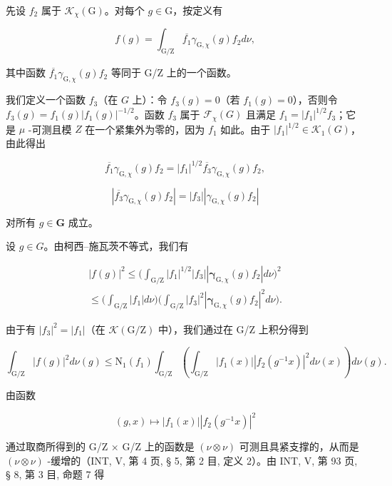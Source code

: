 先设 \(f_2\) 属于 \(\mathcal{K}_{\chi}(\mathrm{G})\)。对每个 \(g \in \mathrm{G}\)，按定义有

\[
f (g) = \int_ {\mathrm{G/Z}} \overline {{f _ {1}}} \gamma_ {\mathrm{G}, \chi} (g) f _ {2} d \nu ,
\]

其中函数 \(\overline{f_1} \gamma_{\mathrm{G},\chi}(g)f_2\) 等同于 G/Z 上的一个函数。

我们定义一个函数 \(f_3\)（在 \(G\) 上）：令 \(f_3(g) = 0\)（若 \(f_1(g) = 0\)），否则令 \(f_3(g) = f_1(g)|f_1(g)|^{-1/2}\)。函数 \(f_3\) 属于 \(\mathcal{F}_{\chi}(G)\) 且满足 \(f_1 = |f_1|^{1/2}f_3\)；它是 \(\mu\) -可测且模 \(Z\) 在一个紧集外为零的，因为 \(f_1\) 如此。由于 \(|f_1|^{1/2} \in \mathcal{K}_1(G)\)，由此得出

\[
\overline {{f _ {1}}} \gamma_ {\mathrm{G}, \chi} (g) f _ {2} = | f _ {1} | ^ {1 / 2} \overline {{f _ {3}}} \gamma_ {\mathrm{G}, \chi} (g) f _ {2},
\]

\[
| \overline {{f _ {3}}} \gamma_ {\mathrm{G}, \chi} (g) f _ {2} | = | f _ {3} | | \gamma_ {\mathrm{G}, \chi} (g) f _ {2} |
\]

对所有 \(g \in \mathbf{G}\) 成立。

 设 \(g \in G\)。由柯西--施瓦茨不等式，我们有

\[
\begin{array}{l} | f (g) | ^ {2} \leqslant \Big (\int_ {\mathrm{G/Z}} | f _ {1} | ^ {1 / 2} | f _ {3} | | \boldsymbol {\gamma} _ {\mathrm{G}, \chi} (g) f _ {2} | d \nu \Big) ^ {2} \\ \leqslant \Big (\int_ {\mathrm{G/Z}} | f _ {1} | d \nu \Big) \Big (\int_ {\mathrm{G/Z}} | f _ {3} | ^ {2} | \boldsymbol {\gamma} _ {\mathrm{G}, \chi} (g) f _ {2} | ^ {2} d \nu \Big). \end{array}
\]

由于有 \(|f_{3}|^{2}=|f_{1}|\)（在 \(\mathcal{K}(\mathrm{G}/\mathrm{Z})\) 中），我们通过在 G/Z 上积分得到

\[
\int_ {\mathrm{G} / \mathrm{Z}} | f (g) | ^ {2} d \nu (g) \leqslant \mathrm{N} _ {1} (f _ {1}) \int_ {\mathrm{G} / \mathrm{Z}} \left(\int_ {\mathrm{G} / \mathrm{Z}} | f _ {1} (x) | | f _ {2} (g ^ {- 1} x) | ^ {2} d \nu (x)\right) d \nu (g).
\]

由函数

\[
(g, x) \mapsto | f _ {1} (x) | | f _ {2} (g ^ {- 1} x) | ^ {2}
\]

通过取商所得到的 G/Z × G/Z 上的函数是 \((\nu \otimes \nu)\) 可测且具紧支撑的，从而是 \((\nu \otimes \nu)\) -缓增的（INT, V, 第 4 页, § 5, 第 2 目, 定义 2）。由 INT, V, 第 93 页, § 8, 第 3 目, 命题 7 得

